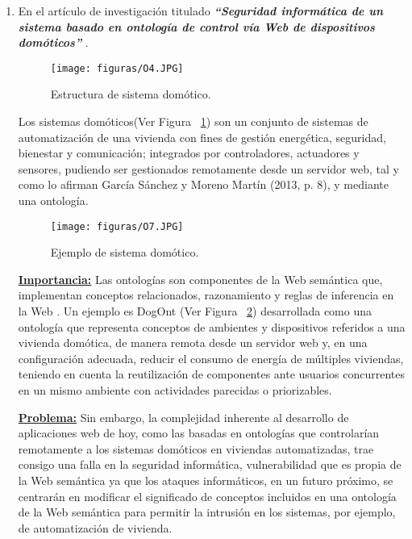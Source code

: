 \documentclass[10pt,conference]{IEEEtran}
\begin{document}
\begin{enumerate}
\item En el artículo de investigación titulado \textbf{\textit{“Seguridad informática de un sistema basado en ontología de control vía Web de dispositivos domóticos”}} \citep{huiman2016seguridad}.

\begin{figure}[H]
 \begin{center}
       \texttt{[image: figuras/O4.JPG]}
      \caption{Estructura de sistema domótico.}
      \label{fO4} 
      \end{center}
\end{figure}

Los sistemas domóticos(Ver Figura ~\ref{fO4}) son un conjunto de sistemas de automatización de una vivienda con fines de gestión energética, seguridad, bienestar y comunicación; integrados por controladores, actuadores y sensores, pudiendo ser gestionados remotamente desde un servidor web, tal y como lo afirman García Sánchez y Moreno Martín (2013, p. 8), y mediante una ontología.

\begin{figure}[H]
 \begin{center}
       \texttt{[image: figuras/O7.JPG]}
      \caption{Ejemplo de sistema domótico.}
      \label{fO7} 
      \end{center}
\end{figure}
\textbf{\underline{Importancia:}}
Las ontologías son componentes de la Web semántica que, implementan conceptos relacionados, razonamiento y reglas de inferencia en la Web . Un ejemplo es DogOnt (Ver Figura ~\ref{fO7}) desarrollada como una ontología que representa conceptos de ambientes y dispositivos referidos a una vivienda domótica, de manera remota desde un servidor web y, en una configuración adecuada, reducir el consumo de energía de múltiples viviendas, teniendo en cuenta la reutilización de componentes ante usuarios concurrentes en un mismo ambiente con actividades parecidas o priorizables.\par
\textbf{\underline{Problema:}}
Sin embargo, la complejidad inherente al desarrollo de aplicaciones web de hoy, como las basadas en ontologías que controlarían remotamente a los sistemas domóticos en viviendas automatizadas, trae consigo una falla en la seguridad informática, vulnerabilidad que es propia de la Web semántica ya que los ataques informáticos, en un futuro próximo, se centrarán en modificar el significado de conceptos incluidos en una ontología de la Web semántica para permitir la intrusión en los sistemas, por ejemplo, de automatización de vivienda. 


\end{enumerate}
\end{document}
